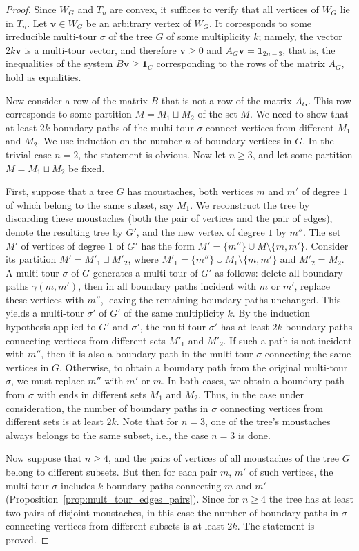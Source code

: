 \documentclass[10pt]{article}
\theoremstyle{plain}
\theoremstyle{definition}
\def\one{\mathbf{1}}
\def\bv{\boldsymbol{v}}
\def\g{\gamma}
\begin{document}
\begin{proof}
Since $W_G$ and $T_n$ are convex, it suffices to verify that all vertices of $W_G$ lie in $T_n$. Let $\bv\in W_G$ be an arbitrary vertex of $W_G$. It corresponds to some irreducible multi-tour $\sigma$ of the tree $G$ of some multiplicity $k$; namely, the vector $2k\bv$ is a multi-tour vector, and therefore $\bv\ge0$ and $A_G\bv=\one_{2n-3}$, that is, the inequalities of the system $B\bv\ge\one_C$ corresponding to the rows of the matrix $A_G$, hold as equalities.

Now consider a row of the matrix $B$ that is not a row of the matrix $A_G$. This row corresponds to some partition $M=M_1\sqcup M_2$ of the set $M$. We need to show that at least $2k$ boundary paths of the multi-tour $\sigma$ connect vertices from different $M_1$ and $M_2$. We use induction on the number $n$ of boundary vertices in $G$. In the trivial case $n=2$, the statement is obvious. Now let $n\ge3$, and let some partition $M=M_1\sqcup M_2$ be fixed.

First, suppose that a tree $G$ has moustaches, both vertices $m$ and $m'$ of degree $1$ of which belong to the same subset, say $M_1$. We reconstruct the tree by discarding these moustaches (both the pair of vertices and the pair of edges), denote the resulting tree by $G'$, and the new vertex of degree $1$ by $m''$. The set $M'$ of vertices of degree $1$ of $G'$ has the form $M'=\{m''\}\cup M\setminus\{m,m'\}$. Consider its partition $M'=M'_1\sqcup M'_2$, where $M'_1=\{m''\}\cup M_1\setminus\{m,m'\}$ and $M'_2=M_2$. A multi-tour $\sigma$ of $G$ generates a multi-tour of $G'$ as follows: delete all boundary paths $\g(m,m')$, then in all boundary paths incident with $m$ or $m'$, replace these vertices with $m''$, leaving the remaining boundary paths unchanged. This yields a multi-tour $\sigma'$ of $G'$ of the same multiplicity $k$. By the induction hypothesis applied to $G'$ and $\sigma'$, the multi-tour $\sigma'$ has at least $2k$ boundary paths connecting vertices from different sets $M'_1$ and $M'_2$. If such a path is not incident with $m''$, then it is also a boundary path in the multi-tour $\sigma$ connecting the same vertices in $G$. Otherwise, to obtain a boundary path from the original multi-tour $\sigma$, we must replace $m''$ with $m'$ or $m$. In both cases, we obtain a boundary path from $\sigma$ with ends in different sets $M_1$ and $M_2$. Thus, in the case under consideration, the number of boundary paths in $\sigma$ connecting vertices from different sets is at least $2k$. Note that for $n=3$, one of the tree's moustaches always belongs to the same subset, i.e., the case $n=3$ is done.

Now suppose that $n\ge 4$, and the pairs of vertices of all moustaches of the tree $G$ belong to different subsets. But then for each pair $m$, $m'$ of such vertices, the multi-tour $\sigma$ includes $k$ boundary paths connecting $m$ and $m'$ (Proposition~\ref{prop:mult_tour_edges_pairs}). Since for $n\ge 4$ the tree has at least two pairs of disjoint moustaches, in this case the number of boundary paths in $\sigma$ connecting vertices from different subsets is at least $2k$. The statement is proved.
\end{proof}
\end{document}
